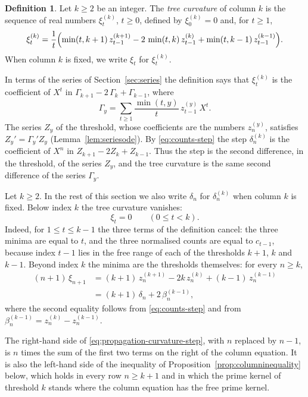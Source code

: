 \documentclass{amsart}
\theoremstyle{definition}
\newtheorem{definition}[theorem]{Definition}
\theoremstyle{remark}
\numberwithin{equation}{section}
\begin{document}
\begin{definition}\label{def:treecurvature}
Let $k\ge2$ be an integer. The \emph{tree curvature} of column $k$ is the
sequence of real numbers $\xi^{(k)}_t$, $t\ge0$, defined by $\xi^{(k)}_0=0$
and, for $t\ge1$,
\[
\xi^{(k)}_t=\frac1t\Bigl(\min(t,k+1)\,z^{(k+1)}_{t-1}
-2\,\min(t,k)\,z^{(k)}_{t-1}+\min(t,k-1)\,z^{(k-1)}_{t-1}\Bigr).
\]
When column $k$ is fixed, we write $\xi_t$ for $\xi^{(k)}_t$.
\end{definition}

In terms of the series of Section~\ref{sec:series} the definition says that
$\xi^{(k)}_t$ is the coefficient of $X^t$ in
$\Gamma_{k+1}-2\,\Gamma_k+\Gamma_{k-1}$, where
\[
\Gamma_y=\sum_{t\ge1}\frac{\min(t,y)}{t}\,z^{(y)}_{t-1}\,X^t .
\]
The series $Z_y$ of the threshold, whose coefficients are the numbers
$z^{(y)}_n$, satisfies $Z_y'=\Gamma_y'Z_y$ (Lemma~\ref{lem:seriesode}). By
\eqref{eq:counts-step} the step $\delta^{(k)}_n$ is the
coefficient of $X^n$ in $Z_{k+1}-2Z_k+Z_{k-1}$. Thus the step is the second
difference, in the threshold, of the series $Z_y$, and the tree curvature is
the same second difference of the series $\Gamma_y$.

Let $k\ge2$. In the rest of this section we also write $\delta_n$ for
$\delta^{(k)}_n$ when column $k$ is fixed. Below index $k$
the tree curvature vanishes:
\begin{equation}\label{eq:propagation-vanishing}
\xi_t=0\qquad(0\le t<k).
\end{equation}
Indeed, for $1\le t\le k-1$ the three terms of the definition cancel: the
three minima are equal to $t$, and the three normalised counts are equal to
$c_{t-1}$, because index $t-1$ lies in the free range of each of the
thresholds $k+1$, $k$ and $k-1$.
Beyond index $k$ the minima are the thresholds themselves: for every
$n\ge k$,
\begin{equation}\label{eq:propagation-curvature-step}
\begin{split}
(n+1)\,\xi_{n+1}&=(k+1)\,z^{(k+1)}_n-2k\,z^{(k)}_n+(k-1)\,z^{(k-1)}_n\\
&=(k+1)\,\delta_n+2\,\beta^{(k-1)}_n ,
\end{split}
\end{equation}
where the second equality follows from \eqref{eq:counts-step}
and from $\beta^{(k-1)}_n=z^{(k)}_n-z^{(k-1)}_n$.

The right-hand side of \eqref{eq:propagation-curvature-step}, with $n$
replaced by $n-1$, is $n$ times the sum of the first two terms on the right
of the column equation. It is also the left-hand side of the inequality of
Proposition~\ref{prop:columninequality} below, which holds in every row
$n\ge k+1$ and in which the prime kernel of threshold $k$ stands where the
column equation has the free prime kernel.
\end{document}
